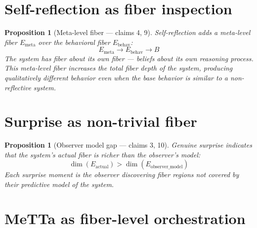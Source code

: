 \documentclass[11pt,a4paper]{article}
\newtheorem{proposition}[definition]{Proposition}
\begin{document}
\section{Self-reflection as fiber inspection}

\begin{proposition}[Meta-level fiber --- claims 4, 9]
\label{prop:reflection}
Self-reflection adds a meta-level fiber $E_{\text{meta}}$ over the
behavioral fiber $E_{\text{behav}}$:
\[
  E_{\text{meta}} \to E_{\text{behav}} \to B
\]
The system has fiber about its own fiber --- beliefs about its own
reasoning process. This meta-level fiber increases the total fiber depth
of the system, producing qualitatively different behavior even when the
base behavior is similar to a non-reflective system.
\end{proposition}

\section{Surprise as non-trivial fiber}

\begin{proposition}[Observer model gap --- claims 3, 10]
\label{prop:surprise}
Genuine surprise indicates that the system's actual fiber is richer
than the observer's model:
\[
  \dim(E_{\text{actual}}) > \dim(E_{\text{observer\_model}})
\]
Each surprise moment is the observer discovering fiber regions not
covered by their predictive model of the system.
\end{proposition}


\section{MeTTa as fiber-level orchestration}
\label{sec:metta}
\end{document}
